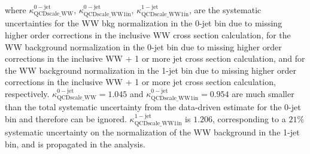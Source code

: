 where $\kappa^{\mathrm{0-jet}}_{\mathrm{QCDscale\_WW}}$, $\kappa^{\mathrm{0-jet}}_{\mathrm{QCDscale\_WW1in}}$,
$\kappa^{\mathrm{1-jet}}_{\mathrm{QCDscale\_WW1in}}$, are the systematic uncertainties for the WW bkg normalization in 
the 0-jet bin due to missing higher order corrections in the inclusive WW cross section calculation,
for the WW background normalization in the 0-jet bin due to missing higher order corrections in the inclusive WW + 1 or 
more jet cross section calculation, and for the WW background normalization in the 1-jet bin due to missing higher 
order corrections in the inclusive WW + 1 or more jet cross section calculation, respectively. 
$\kappa^{\mathrm{0-jet}}_{\mathrm{QCDscale\_WW}} = 1.045$ and $\kappa^{\mathrm{0-jet}}_{\mathrm{QCDscale\_WW1in}} = 0.954$
are much smaller than the total systematic uncertainty from the data-driven estimate for the 0-jet bin and
therefore can be ignored. $\kappa^{\mathrm{1-jet}}_{\mathrm{QCDscale\_WW1in}}$ is $1.206$, corresponding to 
a $21\%$ systematic uncertainty on the normalization of the WW background in the 1-jet bin, and is propagated in the
analysis.
